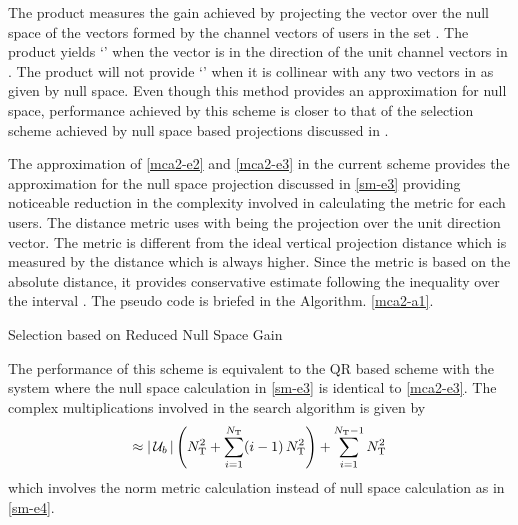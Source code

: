 The product measures the gain achieved by projecting the vector  over the null space of the vectors formed by the channel vectors of users in the set . The product yields `' when the vector  is in the direction of the unit channel vectors in . The product will not provide `' when it is collinear with any two vectors in  as given by null space. Even though this method provides an approximation for null space, performance achieved by this scheme is closer to that of the selection scheme achieved by null space based projections discussed in \cite{sus2006zfbf,antti_user_selection,icsps2010}.

The approximation of \eqref{mca2-e2} and \eqref{mca2-e3} in the current scheme provides the approximation for the null space projection discussed in \eqref{sm-e3} providing noticeable reduction in the complexity involved in calculating the metric for each users. The distance metric uses  with  being the projection over the unit direction vector. The metric is different from the ideal vertical projection distance which is measured by the distance which is always higher. Since the metric is based on the absolute distance, it provides conservative estimate following the inequality  over the interval . The pseudo code is briefed in the Algorithm. \ref{mca2-a1}.

\begin{algorithm}
 \SetAlgoLined
 \DontPrintSemicolon
 \caption{Selection based on Reduced Null Space Gain}
 \label{mca2-a1}
\end{algorithm}

The performance of this scheme is equivalent to the QR based scheme with the  system where the null space calculation in \eqref{sm-e3} is identical to \eqref{mca2-e3}. The complex multiplications involved in the search algorithm is given by
\begin{equation}
\approx | \, \mathcal{U}_b \, | \left ( N^2_{\mathrm{T}} + \sum^{N_{\mathrm{T}}}_{i = 1} (i - 1) \, N^2_{\mathrm{T}} \right ) + \sum^{N_{\mathrm{T}} - 1}_{i = 1} N^2_{\mathrm{T}}
\label{mca2-e4}
\end{equation}
which involves the norm metric calculation instead of null space calculation as in \eqref{sm-e4}.
